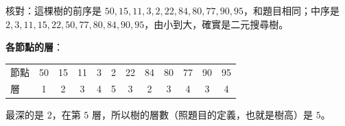 \begin{pastsoln}
核對：這棵樹的前序是 $50, 15, 11, 3, 2, 22, 84, 80, 77, 90, 95$，和題目相同；中序是
$2, 3, 11, 15, 22, 50, 77, 80, 84, 90, 95$，由小到大，確實是二元搜尋樹。

\textbf{各節點的層}：
\begin{center}
\begin{tabular}{l*{11}{c}}
\toprule
節點 & 50 & 15 & 11 & 3 & 2 & 22 & 84 & 80 & 77 & 90 & 95 \\
層 & 1 & 2 & 3 & 4 & 5 & 3 & 2 & 3 & 4 & 3 & 4 \\
\bottomrule
\end{tabular}
\end{center}
最深的是 $2$，在第 $5$ 層，所以樹的層數（照題目的定義，也就是樹高）是 $5$。
\end{pastsoln}
